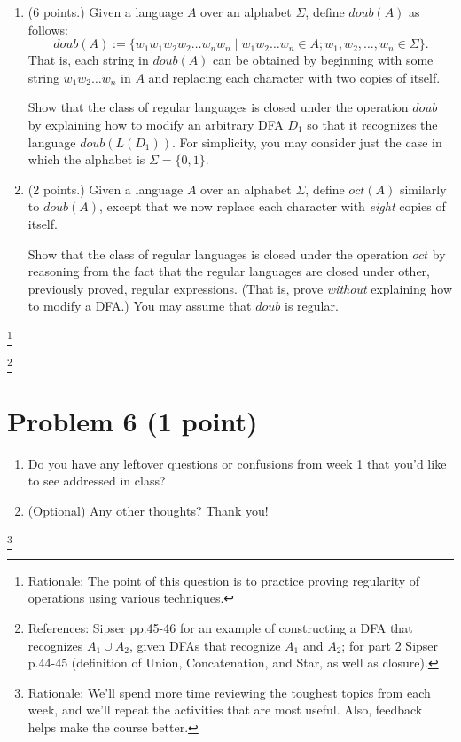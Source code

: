 \documentclass[letterpaper,11pt,twoside]{article}
\theoremstyle{plain}
\theoremstyle{definition}
\theoremstyle{remark}
\theoremstyle{restate}
\newcommand\blfootnote[1]{%
  \begingroup
  \renewcommand\thefootnote{}\footnote{#1}%
  \addtocounter{footnote}{-1}%
  \endgroup
}
\begin{document}
\begin{enumerate}
    \item (6 points.) Given a language $A$ over an alphabet $\Sigma$, define $doub(A)$ as follows:
    \[
        doub(A) := \{w_1w_1w_2w_2\dots w_nw_n \; | \; w_1w_2\dots w_n \in A; w_1, w_2, \dots, w_n \in \Sigma\}.
    \]
    That is, each string in $doub(A)$ can be obtained by beginning with some string $w_1w_2\dots w_n$ in $A$ and replacing each character with two copies of itself.

    Show that the class of regular languages is closed under the operation $doub$ by explaining how to modify an arbitrary DFA $D_1$ so that it recognizes the language $doub(L(D_1))$. For simplicity, you may consider just the case in which the alphabet is $\Sigma = \{0,1\}$.

    \item (2 points.) Given a language $A$ over an alphabet $\Sigma$, define $oct(A)$ similarly to $doub(A)$, except that we now replace each character with \emph{eight} copies of itself. 

    Show that the class of regular languages is closed under the operation $oct$ by reasoning from the fact that the regular languages are closed under other, previously proved, regular expressions. (That is, prove \emph{without} explaining how to modify a DFA.) You may assume that $doub$ is regular.
\end{enumerate}

\blfootnote{Rationale: The point of this question is to practice proving regularity of operations using various techniques. }
\blfootnote{References: Sipser pp.45-46 for an example of constructing a DFA that recognizes $A_1 \cup A_2$, given DFAs that recognize $A_1$ and $A_2$; for part 2 Sipser p.44-45 (definition of Union, Concatenation, and Star, as well as closure). }

\clearpage
\section*{Problem 6 (1 point)}
    \begin{enumerate}
        \item Do you have any leftover questions or confusions from week 1 that you'd like to see addressed in class?
        
        \item (Optional) Any other thoughts? Thank you!
    \end{enumerate}

\blfootnote{ Rationale: We'll spend more time reviewing the toughest topics from each week, and we'll repeat the activities that are most useful. Also, feedback helps make the course better. }
\end{document}
